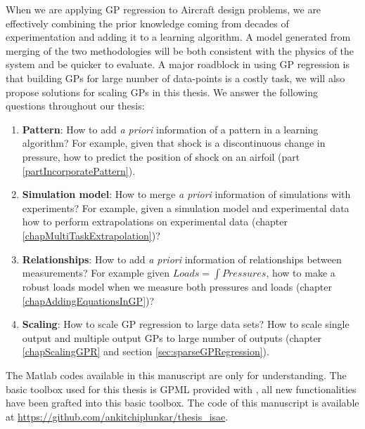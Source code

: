 When we are applying GP regression to Aircraft design problems, we are effectively combining the prior knowledge coming from decades of experimentation and adding it to a learning algorithm. A model generated from merging of the two methodologies will be both consistent with the physics of the system and be quicker to evaluate. A major roadblock in using GP regression is that building GPs for large number of data-points is a costly task, we will also propose solutions for scaling GPs in this thesis. We answer the following questions throughout our thesis:

\begin{enumerate}
\item \textbf{Pattern}: How to add \textit{a priori} information of a pattern in a learning algorithm? For example, given that shock is a discontinuous change in pressure, how to predict the position of shock on an airfoil (part \ref{partIncorporatePattern}). 
\item \textbf{Simulation model}: How to merge \textit{a priori} information of simulations with experiments? For example, given a simulation model and experimental data how to perform extrapolations on experimental data (chapter \ref{chapMultiTaskExtrapolation})?
\item \textbf{Relationships}: How to add \textit{a priori} information of relationships between measurements? For example given $Loads = \int Pressures$, how to make a robust loads model when we measure both pressures and loads (chapter \ref{chapAddingEquationsInGP})?
\item \textbf{Scaling}: How to scale GP regression to large data sets? How to scale single output and multiple output GPs to large number of outputs (chapter \ref{chapScalingGPR} and section \ref{sec:sparseGPRegression}).
\end{enumerate}

The Matlab codes available in this manuscript are only for understanding. The basic toolbox used for this thesis is GPML provided with \cite{Rasmussen2005}, all new functionalities have been grafted into this basic toolbox. The code of this manuscript is available at \url{https://github.com/ankitchiplunkar/thesis_isae}. 


